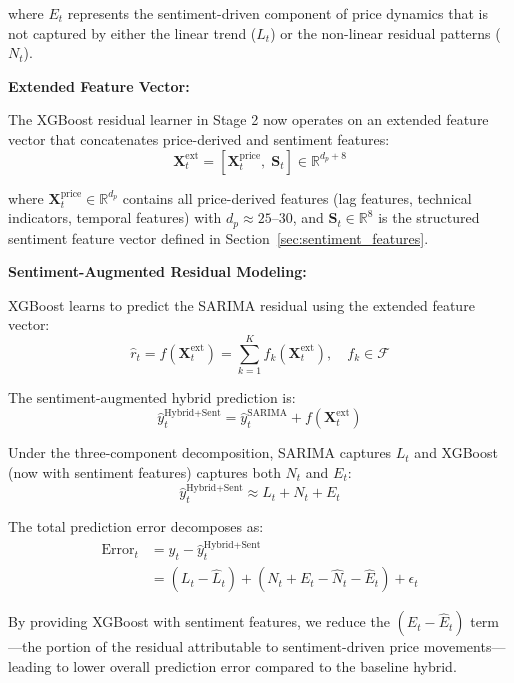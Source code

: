 where $E_t$ represents the sentiment-driven component of price dynamics that is not captured by either the linear trend ($L_t$) or the non-linear residual patterns ($N_t$).

\textbf{Extended Feature Vector:}

The XGBoost residual learner in Stage 2 now operates on an extended feature vector that concatenates price-derived and sentiment features:
\begin{equation}
\mathbf{X}_t^{\text{ext}} = \left[\mathbf{X}_t^{\text{price}},\; \mathbf{S}_t\right] \in \mathbb{R}^{d_p + 8}
\end{equation}

where $\mathbf{X}_t^{\text{price}} \in \mathbb{R}^{d_p}$ contains all price-derived features (lag features, technical indicators, temporal features) with $d_p \approx 25$--$30$, and $\mathbf{S}_t \in \mathbb{R}^8$ is the structured sentiment feature vector defined in Section~\ref{sec:sentiment_features}.

\textbf{Sentiment-Augmented Residual Modeling:}

XGBoost learns to predict the SARIMA residual using the extended feature vector:
\begin{equation}
\hat{r}_t = f\left(\mathbf{X}_t^{\text{ext}}\right) = \sum_{k=1}^{K} f_k\left(\mathbf{X}_t^{\text{ext}}\right), \quad f_k \in \mathcal{F}
\end{equation}

The sentiment-augmented hybrid prediction is:
\begin{equation}
\hat{y}_t^{\text{Hybrid+Sent}} = \hat{y}_t^{\text{SARIMA}} + f\left(\mathbf{X}_t^{\text{ext}}\right)
\end{equation}

Under the three-component decomposition, SARIMA captures $L_t$ and XGBoost (now with sentiment features) captures both $N_t$ and $E_t$:
\begin{equation}
\hat{y}_t^{\text{Hybrid+Sent}} \approx L_t + N_t + E_t
\end{equation}

The total prediction error decomposes as:
\begin{align}
\text{Error}_t &= y_t - \hat{y}_t^{\text{Hybrid+Sent}} \nonumber \\
&= (L_t - \hat{L}_t) + (N_t + E_t - \hat{N}_t - \hat{E}_t) + \epsilon_t
\end{align}

By providing XGBoost with sentiment features, we reduce the $(E_t - \hat{E}_t)$ term---the portion of the residual attributable to sentiment-driven price movements---leading to lower overall prediction error compared to the baseline hybrid.

